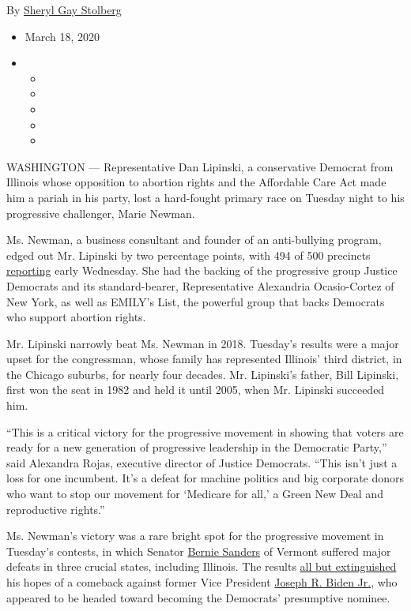 By
\href{https://www.nytimes3xbfgragh.onion/by/sheryl-gay-stolberg}{Sheryl
Gay Stolberg}

\begin{itemize}
\item
  March 18, 2020
\item
  \begin{itemize}
  \item
  \item
  \item
  \item
  \item
  \end{itemize}
\end{itemize}

WASHINGTON --- Representative Dan Lipinski, a conservative Democrat from
Illinois whose opposition to abortion rights and the Affordable Care Act
made him a pariah in his party, lost a hard-fought primary race on
Tuesday night to his progressive challenger, Marie Newman.

Ms. Newman, a business consultant and founder of an anti-bullying
program, edged out Mr. Lipinski by two percentage points, with 494 of
500 precincts
\href{https://www.nytimes3xbfgragh.onion/interactive/2020/03/17/us/elections/results-illinois-house-district-3-primary-election.html}{reporting}
early Wednesday. She had the backing of the progressive group Justice
Democrats and its standard-bearer, Representative Alexandria
Ocasio-Cortez of New York, as well as EMILY's List, the powerful group
that backs Democrats who support abortion rights.

Mr. Lipinski narrowly beat Ms. Newman in 2018. Tuesday's results were a
major upset for the congressman, whose family has represented Illinois'
third district, in the Chicago suburbs, for nearly four decades. Mr.
Lipinski's father, Bill Lipinski, first won the seat in 1982 and held it
until 2005, when Mr. Lipinski succeeded him.

``This is a critical victory for the progressive movement in showing
that voters are ready for a new generation of progressive leadership in
the Democratic Party,'' said Alexandra Rojas, executive director of
Justice Democrats. ``This isn't just a loss for one incumbent. It's a
defeat for machine politics and big corporate donors who want to stop
our movement for `Medicare for all,' a Green New Deal and reproductive
rights.''

Ms. Newman's victory was a rare bright spot for the progressive movement
in Tuesday's contests, in which Senator
\href{https://www.nytimes3xbfgragh.onion/interactive/2020/us/elections/bernie-sanders.html}{Bernie
Sanders} of Vermont suffered major defeats in three crucial states,
including Illinois. The results
\href{https://www.nytimes3xbfgragh.onion/2020/03/17/us/politics/biden-florida-illinois-primary.html?action=click\&module=ELEX_results\&pgtype=Interactive\&region=ReporterUpdates}{all
but extinguished} his hopes of a comeback against former Vice President
\href{https://www.nytimes3xbfgragh.onion/interactive/2020/us/elections/joe-biden.html}{Joseph
R. Biden Jr.}, who appeared to be headed toward becoming the Democrats'
presumptive nominee.

